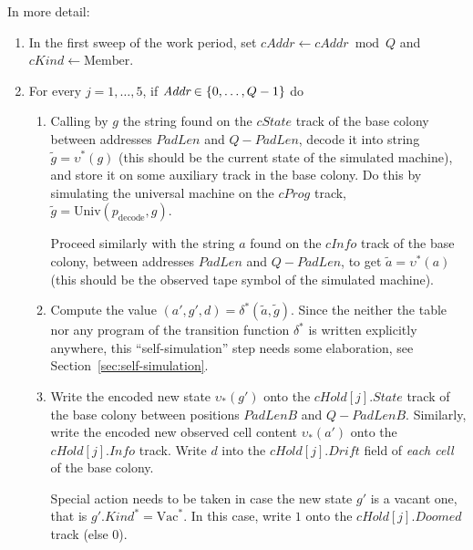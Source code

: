 \documentclass[12pt]{memoir}
\newcommand{\fld}[1]{\ensuremath{\textit{#1}}}
\def\B{B}
\newcommand{\Addr}{\fld{Addr}}
\newcommand{\cAddr}{\fld{cAddr}}
\newcommand{\Drift}{\fld{Drift}}
\newcommand{\Doomed}{\fld{Doomed}}
\newcommand{\cHold}{\fld{cHold}}
\newcommand{\Info}{\fld{Info}}
\newcommand{\cInfo}{\fld{cInfo}}
\newcommand{\Kind}{\fld{Kind}}
\newcommand{\cKind}{\fld{cKind}}
\newcommand{\cProg}{\fld{cProg}}
\newcommand{\State}{\fld{State}}
\newcommand{\cState}{\fld{cState}}
\newcommand{\decode}{\mathrm{decode}}
\newcommand{\Member}{\mathrm{Member}}
\newcommand{\PadLen}{\mathit{PadLen}}
\newcommand{\Un}{\mathrm{Univ}}
\newcommand{\Vacant}{\mathrm{Vac}}
\begin{document}
In more detail:
\begin{enumerate}
     \item   In the first sweep of the work period, set
      \( \cAddr \gets \cAddr\bmod{Q} \) and \( \cKind \gets \Member \).

      \item For every \( j=1,\dots,5 \), if \( \Addr \in \set{0, \dots, Q-1} \) do

       \begin{enumerate}

          \item Calling by \( g \) the  string found on the \( \cState \) track of
            the base colony between addresses \( \PadLen \)
            and \( Q-\PadLen \), decode it into string \( \tilde g=\upsilon^{*}(g) \)
            (this should be the current state of the simulated machine), and
            store it on some auxiliary track in the base colony.
            Do this by simulating the universal machine on the \( \cProg \) track,
            \( \tilde g = \Un(p_{\decode}, g) \).

            Proceed similarly with the string \( a \) found on the \( \cInfo \)
            track of the base colony, between addresses \( \PadLen \)
            and \( Q-\PadLen \), to get \( \tilde a = \upsilon^{*}(a) \)
            (this should be the observed tape symbol of the simulated machine).

          \item \label{i:comp.trans}
           Compute the value \( (a',g',d)=\delta^{*}(\tilde a, \tilde g) \).
Since the neither the table nor any program of the transition 
function \( \delta^{*} \) is written explicitly anywhere, this ``self-simulation'' step needs
some elaboration, see Section~\ref{sec:self-simulation}.

            \item\label{i:comp.write}
              Write the encoded new state \( \upsilon_{*}(g') \) onto the
              \( \cHold[j].\State \) track of the base colony between positions
              \( \PadLen\B \) and \( Q-\PadLen\B \).
              Similarly, write the encoded new observed cell
              content \( \upsilon_{*}(a') \) onto the \( \cHold[j].\Info \) track.
              Write \( d \) into the \( \cHold[j].\Drift \) field of \emph{each cell} of
              the base colony.

              Special action needs to be taken in case 
              the new state \( g' \) is a vacant one, that is 
              \( g'.\Kind^{*}=\Vacant^{*} \).
              In this case, write \( 1 \) onto the \( \cHold[j].\Doomed \) track (else 0).


\end{enumerate}
\end{enumerate}
\end{document}
